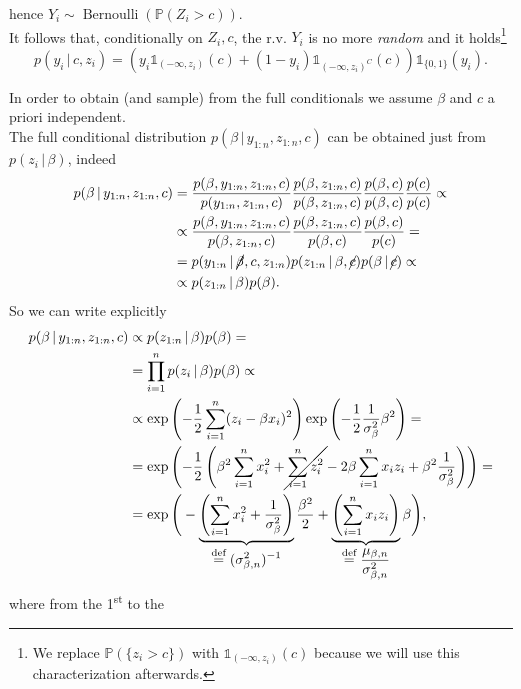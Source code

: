 \documentclass[
  11pt,
]{article}
\begin{document}
\begin{itemize}
\begin{gather*}
\begin{aligned}
        \end{aligned}
    \end{gather*} hence
  \(Y_i \sim \operatorname{Bernoulli}\left(\mathbb{P}\left(Z_i > c\right)\right)\).\\
  It follows that, conditionally on \(Z_i, c\), the r.v. \(Y_i\) is no
  more \textit{random} and it holds\footnote{We replace
    \(\mathbb{P}\left(\{z_i > c\}\right)\) with
    \(\mathds{1}_{(-\infty, z_i)}(c)\) because we will use this
    characterization afterwards.} \[
        p(y_i \,|\,c, z_i) = \left(y_i \mathds{1}_{(-\infty, z_i)}(c) + (1 - y_i) \mathds{1}_{(-\infty, z_i)^C}(c)\right) \mathds{1}_{\{0, 1\}}(y_i).
    \]
\end{itemize}

In order to obtain (and sample) from the full conditionals we assume
\(\beta\) and \(c\) a priori independent.\\
The full conditional distribution \(p(\beta \,|\,y_{1:n}, z_{1:n}, c)\)
can be obtained just from \(p(z_i \,|\,\beta)\), indeed \begin{align*}
        p(\beta \,|\,y_{1:n}, z_{1:n}, c) & = \frac{p(\beta, y_{1:n}, z_{1:n}, c)}{p(y_{1:n}, z_{1:n}, c)} \frac{p(\beta, z_{1:n}, c)}{p(\beta, z_{1:n}, c)} \frac{p(\beta, c)}{p(\beta, c)} \frac{p(c)}{p(c)} \propto \\
        & \propto \frac{p(\beta, y_{1:n}, z_{1:n}, c)}{p(\beta, z_{1:n}, c)} \frac{p(\beta, z_{1:n}, c)}{p(\beta, c)} \frac{p(\beta, c)}{p(c)} = \\
        & = p(y_{1:n} \,|\,\cancel{\beta}, c, z_{1:n}) p(z_{1:n} \,|\,\beta, \cancel{c}) p(\beta \,|\,\cancel{c}) \propto \\
        & \propto p(z_{1:n} \,|\,\beta) p(\beta).
    \end{align*} So we can write explicitly \begin{align*}
        p(\beta \,|\,y_{1:n}, z_{1:n}, c) & \propto p(z_{1:n} \,|\,\beta) p(\beta) = \\
        & = \prod_{i = 1}^n p(z_i \,|\,\beta) p(\beta) \propto \\
        & \propto \operatorname{exp}\left(-\frac{1}{2} \sum_{i = 1}^{n} (z_i - \beta x_i)^2\right) \operatorname{exp}\left(-\frac{1}{2} \frac{1}{\sigma_\beta^2} \beta^2\right) = \\
        & = \operatorname{exp}\left(-\frac{1}{2} \left(\beta^2 \sum_{i = 1}^{n} x_i^2 + \cancel{\sum_{i = 1}^{n} z_i^2} - 2 \beta \sum_{i = 1}^{n} x_i z_i + \beta^2 \frac{1}{\sigma_\beta^2} \right)\right) = \\
        & = \operatorname{exp}\Bigg(- \underbrace{\left(\sum_{i = 1}^{n} x_i^2 + \frac{1}{\sigma_\beta^2}\right)}_{\displaystyle \stackrel{\text{def}}{=}(\sigma_{\beta, n}^2)^{-1}} \frac{\beta^2}{2} + \underbrace{\left(\sum_{i = 1}^{n} x_i z_i \right)}_{\displaystyle \stackrel{\text{def}}{=}\frac{\mu_{\beta, n}}{\sigma_{\beta, n}^2}} \beta \Bigg) ,
    \end{align*} where from the 1\textsuperscript{st} to the
\end{document}
